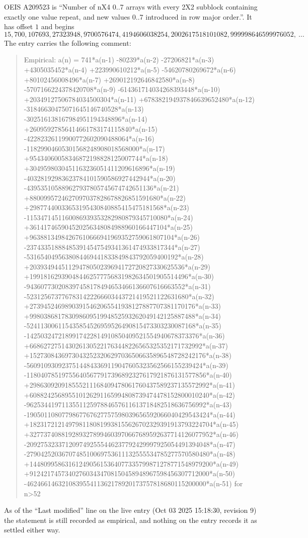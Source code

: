\documentclass[11pt,a4paper]{article}
\theoremstyle{plain}
\theoremstyle{definition}
\begin{document}
OEIS A209523 is ``Number of nX4 0..7 arrays with every 2X2 subblock containing exactly one value repeat, and new values 0..7 introduced in row major order.''. It has offset $1$ and begins
\[
15, 700, 107693, 27323948, 9700576474, 4194606038254, 2002617518101082, 999998646599976052,\ \dots
\]
The entry carries the following comment:
\begin{quote}\small
Empirical: a(n) = 741*a(n-1) -80239*a(n-2) -27206821*a(n-3) +4305035452*a(n-4) +223990610212*a(n-5) -54620780269672*a(n-6) +80102456008496*a(n-7) +269012192646842580*a(n-8) -5707166224378420708*a(n-9) -614361714034268393448*a(n-10) +20349127506784034500304*a(n-11) +678382194937846639652480*a(n-12) -31846630475071645146740528*a(n-13) -302516138167984951194348896*a(n-14) +26095927856414661783174115840*a(n-15) -42282326119900772602090488064*a(n-16) -11829904605301568248908018568000*a(n-17) +95434060058346872198828125007744*a(n-18) +3049598030451163236051411209616896*a(n-19) -40328192983623784101590586927442944*a(n-20) -439535105889627937805745674742651136*a(n-21) +8800995724627097037828678826851591680*a(n-22) +29877440033653195430840885415475181568*a(n-23) -1153471451160086939353282980879345710080*a(n-24) +361417465904520256348084988960166447104*a(n-25) +96388134984267610666941969352759061807104*a(n-26) -237433518884853914547549341361474933817344*a(n-27) -5316540495638084469441833849843792059400192*a(n-28) +20393494451129478050239694172720827330625536*a(n-29) +199181629390484462577756831982634501905514496*a(n-30) -943607730208397458178494653466136607616663552*a(n-31) -5231256737767831422266603443721419521122631680*a(n-32) +27394524698903915462065541938127887707381170176*a(n-33) +99803868178309860951994852593262049142125887488*a(n-34) -524113006115435854526959526490815473303230087168*a(n-35) -1425032472189917422814910850409521554940678373376*a(n-36) +6686272751430261305221763448226565325352171732992*a(n-37) +15273084369730432523206297036506635896548728242176*a(n-38) -56091093092375144843369119047605323562566155239424*a(n-39) -118040785197556405677917396892327617921876131577856*a(n-40) +298630920918555211168409478061760437589237135572992*a(n-41) +608824256895510126291165994808739474478152800010240*a(n-42) -962534419711355112597884657611613718482518636756992*a(n-43) -1905011080779867767627757598039656592066040429543424*a(n-44) +1823172121497981180819938155626702329391913793224704*a(n-45) +3277374088192893278994603970667689592637714126077952*a(n-46) -2092753233712097492555446237792429997925054491394048*a(n-47) -2790425203670748510069753611132555534785277570580480*a(n-48) +1448099586316124905615364077335799871278771548979200*a(n-49) +912421745734027603434708150458948967598456307712000*a(n-50) -462466146321083955411362178920173757818680115200000*a(n-51) for n>52
\end{quote}
As of the ``Last modified'' line on the live entry (Oct 03 2025 15:18:30, revision 9) the statement is
still recorded as empirical, and nothing on the entry records it as settled either way.
\end{document}
